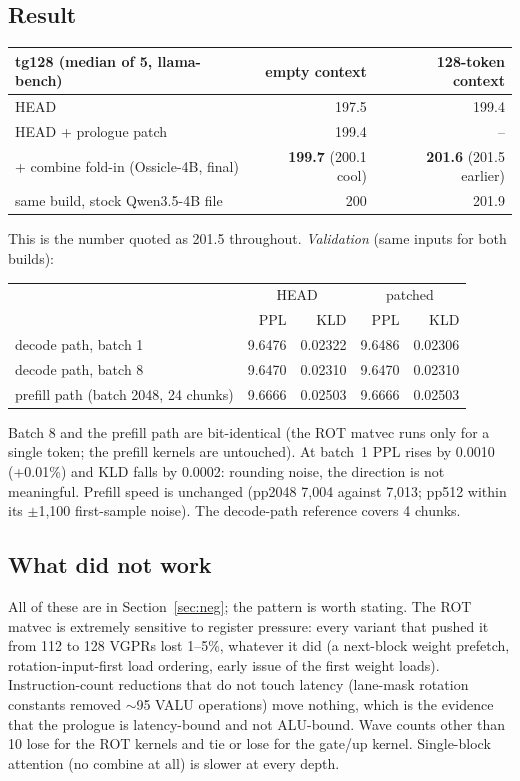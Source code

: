 \documentclass[10pt,a4paper]{article}
\newcommand{\tx}[1]{\texttt{\detokenize{#1}}}
\begin{document}
\subsection{Result}
\begin{center}\small
\begin{tabular}{@{}lrr@{}}
\toprule
tg128 (median of 5, llama-bench) & empty context & 128-token context\\
\midrule
HEAD \tx{ad3d82c29} & 197.5 & 199.4\\
HEAD + prologue patch & 199.4 & --\\
+ combine fold-in (Ossicle-4B, final) & \textbf{199.7} (200.1 cool) & \textbf{201.6} (201.5 earlier)\\
same build, stock Qwen3.5-4B file & 200 & 201.9\\
\bottomrule
\end{tabular}
\end{center}
This is the number quoted as 201.5 throughout. \emph{Validation} (same inputs for both builds):
\begin{center}\small
\begin{tabular}{@{}lrrrr@{}}
\toprule
 & \multicolumn{2}{c}{HEAD} & \multicolumn{2}{c}{patched}\\
 & PPL & KLD & PPL & KLD\\
\midrule
decode path, batch 1 & 9.6476 & 0.02322 & 9.6486 & 0.02306\\
decode path, batch 8 & 9.6470 & 0.02310 & 9.6470 & 0.02310\\
prefill path (batch 2048, 24 chunks) & 9.6666 & 0.02503 & 9.6666 & 0.02503\\
\bottomrule
\end{tabular}
\end{center}
Batch 8 and the prefill path are bit-identical (the ROT matvec runs only for a single token; the prefill kernels are untouched). At batch~1 PPL rises by 0.0010 (+0.01\%) and KLD falls by 0.0002: rounding noise, the direction is not meaningful.
Prefill speed is unchanged (pp2048 7{,}004 against 7{,}013; pp512 within its $\pm$1{,}100 first-sample noise). The decode-path reference covers 4 chunks.

\subsection{What did not work}
All of these are in Section~\ref{sec:neg}; the pattern is worth stating. The ROT matvec is extremely sensitive to register pressure: every variant that pushed it from 112 to 128 VGPRs lost 1--5\%, whatever it did
(a next-block weight prefetch, rotation-input-first load ordering, early issue of the first weight loads). Instruction-count reductions that do not touch latency (lane-mask rotation constants removed $\sim$95 VALU operations)
move nothing, which is the evidence that the prologue is latency-bound and not ALU-bound. Wave counts other than 10 lose for the ROT kernels and tie or lose for the gate/up kernel.
Single-block attention (no combine at all) is slower at every depth.
\end{document}
